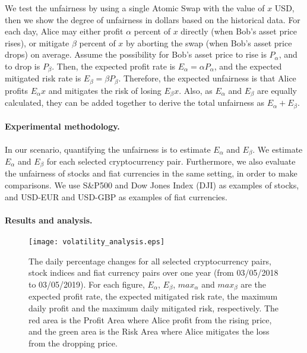 We test the unfairness by using a single Atomic Swap with the value of $x$ USD, then we show the degree of unfairness in dollars based on the historical data.
For each day, Alice may either profit $\alpha$ percent of $x$ directly (when Bob's asset price rises),
or mitigate $\beta$ percent of $x$ by aborting the swap (when Bob's asset price drops) on average.
Assume the possibility for Bob's asset price to rise is $P_{\alpha}$, and to drop is $P_{\beta}$.
Then, the expected profit rate is $E_{\alpha} = \alpha P_{\alpha}$,
and the expected mitigated risk rate is $E_{\beta} = \beta P_{\beta}$.
Therefore, the expected unfairness is that Alice profits $E_{\alpha} x$ and mitigates the risk of losing $E_{\beta} x$.
Also, as $E_\alpha$ and $E_\beta$ are equally calculated, they can be added  together to derive the total unfairness as $E_\alpha + E_\beta$.

\paragraph{Experimental methodology.}
In our scenario, quantifying the unfairness is to estimate $E_{\alpha}$ and $E_{\beta}$.
We estimate $E_{\alpha}$ and $E_{\beta}$ for each selected cryptocurrency pair.
Furthermore,  we also evaluate the unfairness of stocks and fiat currencies in the same setting, in order to make comparisons.
We use S\&P500 and Dow Jones Index (DJI) as examples of stocks, and USD-EUR and USD-GBP as examples of fiat currencies.

\paragraph{Results and analysis.}

\begin{figure*}
    \texttt{[image: volatility\_analysis.eps]}
    \caption{The daily percentage changes for all selected cryptocurrency pairs, stock indices and fiat currency pairs over one year (from 03/05/2018 to 03/05/2019).
    For each figure, $E_{\alpha}$, $E_{\beta}$, $max_\alpha$ and $max_\beta$ are the expected profit rate, the expected mitigated risk rate, the maximum daily profit and the maximum daily mitigated risk, respectively.
    The red area is the Profit Area where Alice profit from the rising price, and the green area is the Risk Area where Alice mitigates the loss from the dropping price.}
    \label{fig:volatility_analysis}
\end{figure*}

